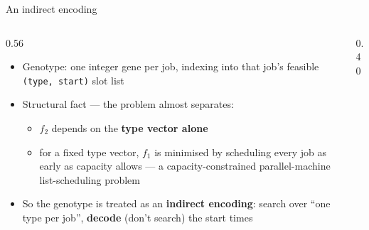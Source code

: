 \documentclass[aspectratio=169,t]{beamer}
\newcommand{\code}[1]{\texttt{#1}}
\begin{document}
\begin{frame}{An indirect encoding}
  \begin{columns}[T,onlytextwidth]
    \begin{column}{0.56\textwidth}
      \begin{itemize}
        \item Genotype: one integer gene per job, indexing into that job's
          feasible \code{(type, start)} slot list
        \item \alert{Structural fact --- the problem almost separates:}
        \begin{itemize}
          \item $f_2$ depends on the \textbf{type vector alone}
          \item for a fixed type vector, $f_1$ is minimised by scheduling
            every job as early as capacity allows --- a capacity-constrained
            parallel-machine list-scheduling problem
        \end{itemize}
        \item So the genotype is treated as an \textbf{indirect encoding}:
          search over ``one type per job'', \textbf{decode} (don't search)
          the start times
      \end{itemize}
    \end{column}
    \begin{column}{0.40\textwidth}
    \end{column}
  \end{columns}
\end{frame}
\end{document}

